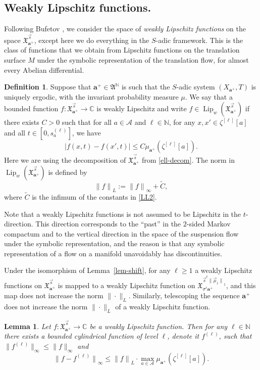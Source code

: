 \documentclass[10pt]{amsart}
\let\mathcal\mathscr
\theoremstyle{plain}
\newtheorem{lemma}[theorem]{Lemma}
\theoremstyle{definition}
\newtheorem{defi}[theorem]{Definition}
\let\wt\widetilde
\DeclareMathOperator{\Lip}{Lip}
\newcommand\bom{{\boldsymbol a}}\let\ba\bom
\let\sig\sigma
\newcommand\FrA{\mathfrak{A}}
\newcommand\Xx{\mathfrak{X}}
\newcommand\Ak{\mathcal{A}}
\newcommand{\C}{\mathbb{C}}
\newcommand{\N}{\mathbb{N}}
\newcommand\be{\begin{equation}}
\newcommand\ee{\end{equation}}
\begin{document}
\subsection{Weakly Lipschitz functions.} \label{sec-weakl}
Following Bufetov \cite{Bufetov1, Buf-umn}, we consider the space of \emph{weakly Lipschitz functions} on the space $\Xx_{\ba^+}^{\vec{s}}$, except here we do everything in the $S$-adic framework. This is the class of functions that we obtain from Lipschitz functions on the translation surface $M$ under the symbolic representation of the translation flow, for almost every Abelian
differential.

\begin{defi}
Suppose that $\ba^+\in \FrA^\N$ is such that the $S$-adic system $(X_{\ba^+},T)$ is uniquely ergodic, with the invariant probability measure $\mu$.
We say that a bounded function $f:\Xx_{\ba^+}^{\vec{s}}\to \C$ is weakly Lipschitz and write $f\in \Lip_w (\Xx_{\ba^+}^{\vec{s}})$
if there exists $C>0$ such that for all $a\in \Ak$ and $\ell\in \N$, for any $x,x'\in \zeta^{[\ell]}[a]$ and all $t\in [0, s_a^{(\ell)}]$, we have
\be \label{LL2}
|f(x,t)-f(x',t)|\le C \mu_{\ba^+}(\zeta^{[\ell]}[a]).
\ee
Here we are using the decomposition of $\Xx_{\ba^+}^{\vec{s}}$ from \eqref{ell-decom}.
The norm in $\Lip_w (\Xx_{\ba^+}^{\vec{s}})$ is defined by
\be \label{Lip-norm}
{\|f\|}_L:= {\|f\|}_\infty + \wt{C},
\ee
where $\wt{C}$ is the infimum of the constants in \eqref{LL2}.
\end{defi}

Note that a weakly Lipschitz functions is not assumed to be Lipschitz in the $t$\nobreakdash-direction. This direction corresponds to the ``past'' in the $2$-sided Markov compactum and to the vertical direction in the space of the suspension flow under the symbolic representation, and the reason is that any symbolic representation of a flow on a manifold unavoidably has discontinuities.

Under the isomorphism of Lemma~\ref{lem-shift}, for any $\ell\ge 1$ a weakly Lipschitz functions on $\Xx_{\ba^+}^{\vec{s}}$ is mapped to a weakly Lipschitz function on
$\Xx_{\sig^\ell\ba^+}^{\vec{s}^{\ell}{\|\vec \mu_\ell\|}_1}$, and this map does not increase the norm $\|\cdot\|_L$. Similarly, telescoping the sequence $\ba^+$ does not increase the norm $\|\cdot\|_L$
of a weakly Lipschitz function.

\begin{lemma} \label{lem-approx}
Let $f:\Xx_{\ba^+}^{\vec{s}}\to \C$ be a weakly Lipschitz function. Then for any $\ell\in \N$ there exists a bounded cylindrical function of level $\ell$, denote it $f^{(\ell)}$, such that
$\|f^{(\ell)}\|_\infty \le \|f\|_\infty$ and
\[
{\|f - f^{(\ell)}\|}_\infty \le {\|f\|}_L\cdot \max_{a\in \Ak} \mu_{\bom^+}(\zeta^{[\ell]}[a]).
\]
\end{lemma}
\end{document}
